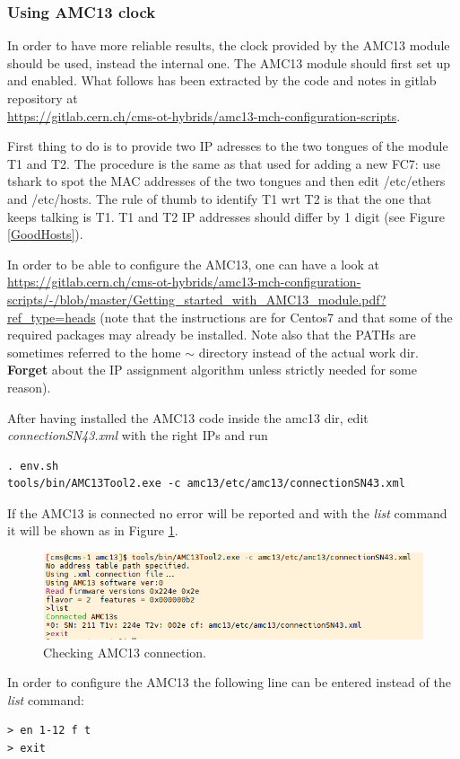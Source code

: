\documentclass[10pt,a4paper]{article}
\begin{document}
\subsubsection{Using AMC13 clock}
\label{AMC13}
In order to have more reliable results, the clock provided by the AMC13 module should be used, instead the internal one.
The AMC13 module should first set up and enabled. What follows has been extracted by the code and notes in gitlab repository at\\ \url{https://gitlab.cern.ch/cms-ot-hybrids/amc13-mch-configuration-scripts}.

First thing to do is to provide two IP adresses to the two tongues of the module T1 and T2. The procedure is the same as that used for adding a new FC7: use tshark to spot the MAC addresses of the two tongues and then edit /etc/ethers and /etc/hosts. The rule of thumb to identify T1 wrt T2 is that the one that keeps talking is T1. T1 and T2 IP addresses should differ by 1 digit (see Figure \ref{GoodHosts}).

In order to be able to configure the AMC13, one can have a look at \\
\url{https://gitlab.cern.ch/cms-ot-hybrids/amc13-mch-configuration-scripts/-/blob/master/Getting_started_with_AMC13_module.pdf?ref_type=heads} 
 (note that the instructions are for Centos7 and that some of the required packages may already be installed. Note also that the PATHs are sometimes referred to the home $\sim$ directory instead of the actual work dir. {\bf Forget} about the IP assignment algorithm unless strictly needed for some reason). 

After having installed the AMC13 code inside the amc13 dir, edit {\it connectionSN43.xml} with the right IPs and run 
\begin{framed}
\begin{verbatim}
. env.sh
tools/bin/AMC13Tool2.exe -c amc13/etc/amc13/connectionSN43.xml
\end{verbatim}
\end{framed}
If the AMC13 is connected no error will be reported and with the {\it list} command it will be shown as in Figure \ref{amc13connected}.
\begin{figure}[h!]
\centering
 \includegraphics[width=\linewidth]{amc13connected.png} 
  \caption{Checking AMC13 connection.}
\label{amc13connected}
\end{figure}
In order to configure the AMC13 the following line can be entered instead of the {\it list} command:
\begin{framed}
\begin{verbatim}
> en 1-12 f t
> exit
\end{verbatim}
\end{framed}
\end{document}
